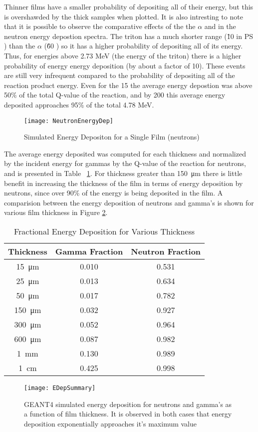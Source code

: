 Thinner films have a smaller probability of depositing all of their energy, but this is overshawded by the thick samples when plotted.
It is also intresting to note that it is possible to observe the comparative effects of the the $\alpha$ and  in the neutron energy depostion spectra. 
The triton has a much shorter range (\~ 10 \micron in PS \cite{kudo_recoil_1980}) than the $\alpha$ (\~ 60 \micron) so it has a higher probability of depositing all of its energy.
Thus, for energies above 2.73 MeV (the energy of the triton) there is a higher probability of energy energy deposition (by about a factor of 10). These events are still very infrequent compared to the probability of depositing all of the reaction product energy.
Even for the 15 \micron the average energy depostion was above 50\% of the total Q-value of the reaction, and by 200 \micron this average energy deposited approaches 95\% of the total 4.78 MeV.
\begin{figure}[h]
    \texttt{[image: NeutronEnergyDep]}
	\caption{Simulated Energy Depositon for a Single Film (neutrons)}
    \label{fig:SimEDepNeutron}
\end{figure}
The average energy deposited was computed for each thickness and normalized by the incident energy for gammas by the Q-value of the reaction for neutrons, and is presented in Table ~\ref{tab:FractionEDep}.
For thickness greater than \SI{150}{\um} there is little benefit in increasing the thickness of the film in terms of energy deposition by neutrons, since over 90\% of the energy is being deposited in the film.
A comparision between the energy deposition of neutrons and gamma's is shown for various film thickness in Figure \ref{fig:SimEDepNGComparison}.
\begin{table}[ht]
    \caption{Fractional Energy Deposition for Various Thickness}
	\centering
	\begin{tabular}{c | c c}
	Thickness & Gamma Fraction & Neutron Fraction \\
	\hline
	\hline
	\SI{15}{\um} & 0.010 & 0.531 \\
	\SI{25}{\um} & 0.013 & 0.634 \\
	\SI{50}{\um} & 0.017 & 0.782 \\
	\SI{150}{\um} & 0.032 & 0.927 \\
	\SI{300}{\um} & 0.052 & 0.964 \\
	\SI{600}{\um} & 0.087 & 0.982 \\
	\SI{1}{\mm} & 0.130 & 0.989 \\
	\SI{1}{\cm} & 0.425 & 0.998 \\
	\end{tabular}
  \label{tab:FractionEDep}
\end{table}
\begin{figure}
  \texttt{[image: EDepSummary]}
  \caption[Comparison of Neutron and Gamma Energy Depostion]{GEANT4 simulated energy deposition for neutrons and gamma's as a function of film thickness.  It is observed in both cases that energy deposition exponentially approaches it's maximum value}
  \label{fig:SimEDepNGComparison}
\end{figure}

